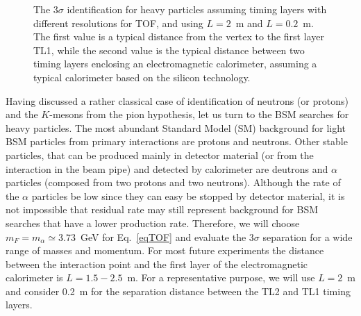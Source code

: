 \begin{figure}
\begin{center}
\end{center}
\caption{
The $3\sigma$ identification for heavy particles assuming timing layers with different resolutions for TOF, and using $L=2$~m and $L=0.2$~m.
The first value is a typical distance
from the vertex to the first layer TL1, while the second value is the typical  distance
between two timing layers enclosing an electromagnetic calorimeter, assuming a typical calorimeter
based on the silicon technology.
}
\label{fig:signgleBSM}
\end{figure}


Having discussed a rather classical case of identification of neutrons (or protons) and the $K$-mesons from the pion hypothesis,
let us turn to the BSM searches for heavy particles.
The most abundant Standard Model (SM)  background for light BSM  particles from primary interactions are protons and neutrons.
Other stable particles, that can be produced mainly in 
detector material (or from the interaction in the beam pipe) 
and detected by calorimeter are deutrons and $\alpha$ particles (composed from two protons and two neutrons). 
Although the rate of the $\alpha$ particles be low since they can easy be stopped by detector material,
it is not impossible that residual rate may still  represent background for BSM searches that have a lower production rate.  
Therefore, we will choose  $m_F=m_{\alpha}\simeq 3.73$~GeV  for Eq.~\ref{eqTOF} and evaluate the
$3\sigma$ separation for a wide range of masses and momentum.
For most future experiments the distance between the 
interaction point and the first layer of the electromagnetic calorimeter is 
$L=1.5-2.5$~m. For a representative purpose, we will use $L=2$~m and consider 0.2~m for the  separation
distance between the TL2 and TL1 timing layers.

